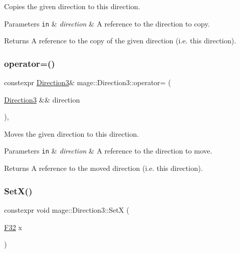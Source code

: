 Copies the given direction to this direction.


\begin{DoxyParams}[1]{Parameters}
\mbox{\tt in}  & {\em direction} & A reference to the direction to copy. \\
\hline
\end{DoxyParams}
\begin{DoxyReturn}{Returns}
A reference to the copy of the given direction (i.\+e. this direction). 
\end{DoxyReturn}
\mbox{\label{structmage_1_1_direction3_a111a8f8d7286bfba0d7586925666315b}} 
\subsubsection{\texorpdfstring{operator=()}{operator=()}\hspace{0.1cm}{\footnotesize\ttfamily [2/2]}}
{\footnotesize\ttfamily constexpr \mbox{\hyperlink{structmage_1_1_direction3}{Direction3}}\& mage\+::\+Direction3\+::operator= (\begin{DoxyParamCaption}\item[{\mbox{\hyperlink{structmage_1_1_direction3}{Direction3}} \&\&}]{direction }\end{DoxyParamCaption})\hspace{0.3cm}{\ttfamily [default]}, {\ttfamily [noexcept]}}

Moves the given direction to this direction.


\begin{DoxyParams}[1]{Parameters}
\mbox{\tt in}  & {\em direction} & A reference to the direction to move. \\
\hline
\end{DoxyParams}
\begin{DoxyReturn}{Returns}
A reference to the moved direction (i.\+e. this direction). 
\end{DoxyReturn}
\mbox{\label{structmage_1_1_direction3_a0c2b501a6e30261d872227bb73be8914}} 
\subsubsection{\texorpdfstring{Set\+X()}{SetX()}}
{\footnotesize\ttfamily constexpr void mage\+::\+Direction3\+::\+SetX (\begin{DoxyParamCaption}\item[{\mbox{\hyperlink{namespacemage_aa97e833b45f06d60a0a9c4fc22ae02c0}{F32}}}]{x }\end{DoxyParamCaption})\hspace{0.3cm}{\ttfamily [noexcept]}}

